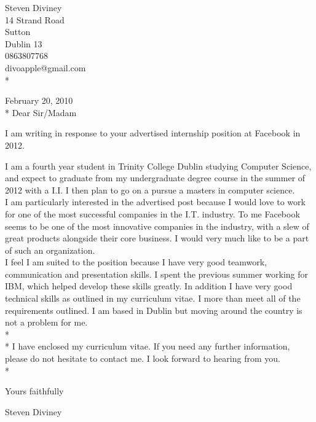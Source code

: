\documentclass{res}
\begin{document}
 

\begin{flushright}
   Steven Diviney \\
   14 Strand Road \\
   Sutton \\
   Dublin 13 \\
   0863807768 \\
   divoapple@gmail.com \\* \vspace{10 mm}
\end{flushright}
\begin{flushleft}
 
February 20, 2010\\*\vspace{10 mm}
Dear Sir/Madam
\end{flushleft}
I am writing in response to your advertised internship position at Facebook in 2012.

I am a fourth year student in Trinity College Dublin studying Computer Science, and expect to graduate from my undergraduate degree course in the summer of 2012 with a I.I. I then plan to go on a pursue a masters in computer science.\\
I am particularly interested in the advertised post because I would love to work for one of the most successful companies in the I.T. industry. To me Facebook seems to be one of the most innovative companies in the industry, with a slew of great products alongside their core business. I would very much like to be a part of such an organization.\\
I feel I am suited to the position because I have very good teamwork, communication and presentation skills. I spent the previous summer working for IBM, which helped develop these skills greatly. In addition I have very good technical skills as outlined in my curriculum vitae. I more than meet all of the requirements outlined. I am based in Dublin but moving around the country is not a problem for me.
\\*
\\*
I have enclosed my curriculum vitae. If you need any further information, please do not hesitate to contact me. I look forward to hearing from you.\\*

\begin{flushleft}
Yours faithfully\\\vspace{10mm}

Steven Diviney\\
\end{flushleft}
\end{document}
